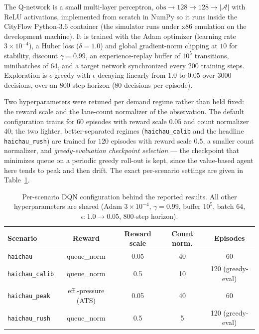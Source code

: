 The Q-network is a small multi-layer perceptron, $\text{obs}\!\to\!128\!\to\!128\!\to\!
|\mathcal{A}|$ with ReLU activations, implemented from scratch in NumPy so it runs inside
the CityFlow Python-3.6 container (the simulator runs under x86 emulation on the
development machine). It is trained with the Adam optimizer (learning rate
$3\!\times\!10^{-4}$), a Huber loss ($\delta=1.0$) and global gradient-norm clipping at
$10$ for stability, discount $\gamma=0.99$, an experience-replay buffer of $10^5$
transitions, minibatches of $64$, and a target network synchronized every $200$ training
steps. Exploration is $\epsilon$-greedy with $\epsilon$ decaying linearly from $1.0$ to
$0.05$ over $3000$ decisions, over an $800$-step horizon ($80$ decisions per episode).

Two hyperparameters were retuned per demand regime rather than held fixed: the reward
scale and the lane-count normalizer of the observation. The default configuration trains
for $60$ episodes with reward scale $0.05$ and count normalizer $40$; the two lighter,
better-separated regimes (\texttt{haichau\_calib} and the headline \texttt{haichau\_rush})
are trained for $120$ episodes with reward scale $0.5$, a smaller count normalizer, and
\emph{greedy-evaluation checkpoint selection} --- the checkpoint that minimizes queue on a
periodic greedy roll-out is kept, since the value-based agent here tends to peak and then
drift. The exact per-scenario settings are given in Table~\ref{tab:dqncfg}.

\begin{table}[H]
\centering
\caption{Per-scenario DQN configuration behind the reported results. All other
hyperparameters are shared (Adam $3\!\times\!10^{-4}$, $\gamma=0.99$, buffer $10^5$,
batch $64$, $\epsilon:1.0\!\to\!0.05$, $800$-step horizon).}
\label{tab:dqncfg}
\begin{tabular}{@{}lcccc@{}}
\toprule
\textbf{Scenario} & \textbf{Reward} & \textbf{Reward scale} & \textbf{Count norm.} & \textbf{Episodes} \\
\midrule
\texttt{haichau}       & queue\_norm            & 0.05 & 40 & 60 \\
\texttt{haichau\_calib}& queue\_norm            & 0.5  & 10 & 120 (greedy-eval) \\
\texttt{haichau\_peak} & eff.-pressure (ATS)    & 0.05 & 40 & 60 \\
\texttt{haichau\_rush} & queue\_norm            & 0.5  & 5  & 120 (greedy-eval) \\
\bottomrule
\end{tabular}
\end{table}

